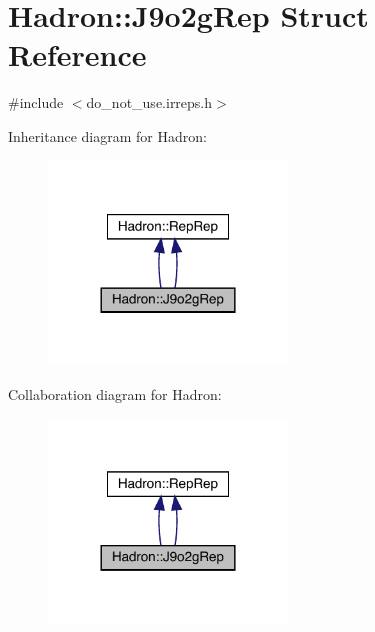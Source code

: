\hypertarget{structHadron_1_1J9o2gRep}{}\section{Hadron\+:\+:J9o2g\+Rep Struct Reference}
\label{structHadron_1_1J9o2gRep}


{\ttfamily \#include $<$do\+\_\+not\+\_\+use.\+irreps.\+h$>$}



Inheritance diagram for Hadron\+:
\nopagebreak
\begin{figure}[H]
\begin{center}
\leavevmode
\includegraphics[width=180pt]{d1/d75/structHadron_1_1J9o2gRep__inherit__graph}
\end{center}
\end{figure}


Collaboration diagram for Hadron\+:
\nopagebreak
\begin{figure}[H]
\begin{center}
\leavevmode
\includegraphics[width=180pt]{d1/dd3/structHadron_1_1J9o2gRep__coll__graph}
\end{center}
\end{figure}
